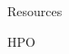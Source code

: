 \documentclass[final]{beamer} %
\begin{document}
\begin{frame}{}
\begin{columns}[T]
\begin{column}{0.3\linewidth}
\begin{block}{\Huge Resources}
    \begin{block}{\Large HPO}
   \begin{columns}[T]
      \begin{column}{.5\textwidth}
      \centering
      \vspace{1cm}
     \end{column}

\end{columns}
\end{block}
\end{block}
\end{column}
\end{columns}
\end{frame}
\end{document}
